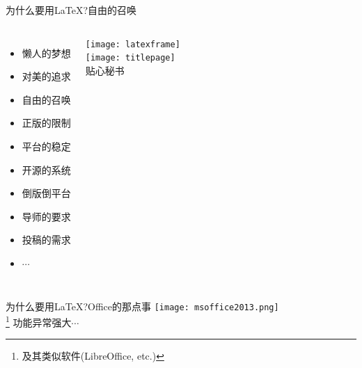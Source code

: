 \documentclass[fontset = none, xcolor=svgnames, t, aspectratio=169]{ctexbeamer}
\begin{document}
\begin{frame}{为什么要用\LaTeX?}{自由的召唤}
  \begin{columns}[c]
    \begin{itemize} \setlength\itemsep{0.7em}
    \item \alert{懒人}的梦想
    \item 对\alert{美}的追求
    \item \alert{自由}的召唤
    \item \alert{正版}的限制
    \item 平台的\alert{稳定}
    \item \alert{开源}的系统
    \item \alert{倒版倒平台}
    \item \alert{导师}的要求
    \item \alert{投稿}的需求
    \item $\cdots$\hphantom{倒版倒a}%
    \end{itemize}
    \begin{center}
      \texttt{[image: latexframe]}\\\vfill
      \texttt{[image: titlepage]}\\%
      贴心\alert{秘书}
    \end{center}
  \end{columns}
\end{frame}

\begin{frame}{为什么要用\LaTeX?}{Office的那点事}%
  \centering
  \texttt{[image: msoffice2013.png]}\\[.5em]
  \msoffice{} \footnote[frame,1]{及其类似软件(LibreOffice, etc.)}%
  功能异常强大$\cdots$
\end{frame}
\end{document}
